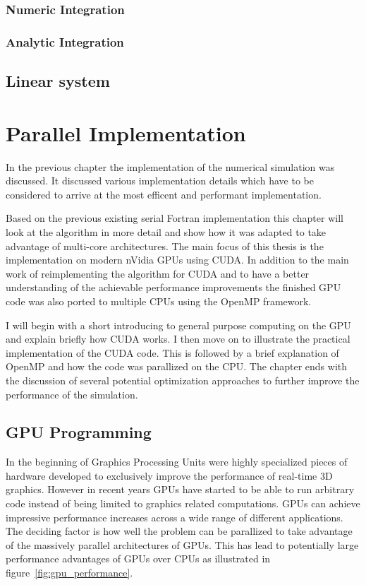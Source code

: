 \documentclass[a4paper,11pt]{kth-mag}
\begin{document}
\subsection{Numeric Integration}
\subsection{Analytic Integration}
\section{Linear system}

\chapter{Parallel Implementation}
In the previous chapter the implementation of the numerical simulation was discussed. It discussed various implementation details which have to be considered to arrive at the most efficent and performant implementation.

Based on the previous existing serial Fortran implementation this chapter will look at the algorithm in more detail and show how it was adapted to take advantage of multi-core architectures. The main focus of this thesis is the implementation
on modern nVidia GPUs using CUDA. In addition to the main work of reimplementing the algorithm for CUDA and to have a better understanding of the achievable performance improvements the finished GPU code was also ported to multiple CPUs using the OpenMP framework.

I will begin with a short introducing to general purpose computing on the GPU and explain briefly how CUDA works. I then move on to illustrate the practical implementation of the CUDA code. This is followed by a brief explanation of OpenMP and how the code was parallized on the CPU. The chapter ends with the discussion of several potential optimization approaches to further improve the performance of the simulation.

\section{GPU Programming}
In the beginning of Graphics Processing Units were highly specialized pieces of hardware developed to exclusively improve the performance of real-time 3D graphics. However in recent years GPUs have started to be able to run arbitrary code instead of being limited to graphics related computations. GPUs can achieve impressive performance increases across a wide range of different applications. The deciding factor is how well the problem can be parallized to take advantage of the massively parallel architectures of GPUs. This has lead to potentially large performance advantages of GPUs over CPUs as illustrated in figure~\ref{fig:gpu_performance}.
\end{document}
